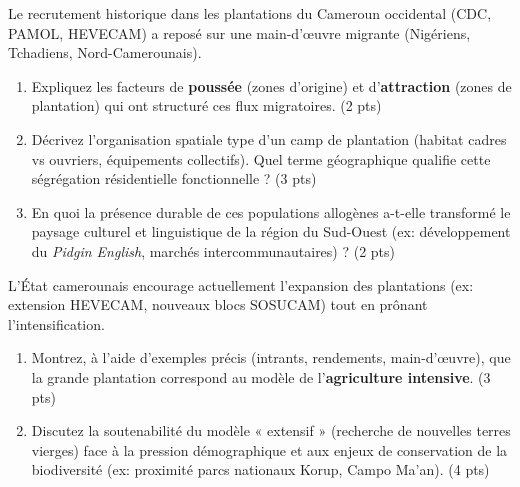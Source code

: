 \documentclass[11pt]{article}
\begin{document}
\begin{exercice}
\noindent Le recrutement historique dans les plantations du Cameroun occidental (CDC, PAMOL, HEVECAM) a reposé sur une main-d'œuvre migrante (Nigériens, Tchadiens, Nord-Camerounais).

\begin{enumerate}
    \item Expliquez les facteurs de \textbf{poussée} (zones d'origine) et d'\textbf{attraction} (zones de plantation) qui ont structuré ces flux migratoires. \hfill (2 pts)
    \item Décrivez l'organisation spatiale type d'un camp de plantation (habitat cadres vs ouvriers, équipements collectifs). Quel terme géographique qualifie cette ségrégation résidentielle fonctionnelle ? \hfill (3 pts)
    \item En quoi la présence durable de ces populations allogènes a-t-elle transformé le paysage culturel et linguistique de la région du Sud-Ouest (ex: développement du \textit{Pidgin English}, marchés intercommunautaires) ? \hfill (2 pts)
\end{enumerate}
\end{exercice}

\begin{exercice}
\noindent L'État camerounais encourage actuellement l'expansion des plantations (ex: extension HEVECAM, nouveaux blocs SOSUCAM) tout en prônant l'intensification.

\begin{enumerate}
    \item Montrez, à l'aide d'exemples précis (intrants, rendements, main-d'œuvre), que la grande plantation correspond au modèle de l'\textbf{agriculture intensive}. \hfill (3 pts)
    \item Discutez la soutenabilité du modèle « extensif » (recherche de nouvelles terres vierges) face à la pression démographique et aux enjeux de conservation de la biodiversité (ex: proximité parcs nationaux Korup, Campo Ma'an). \hfill (4 pts)
\end{enumerate}
\end{exercice}
\end{document}
